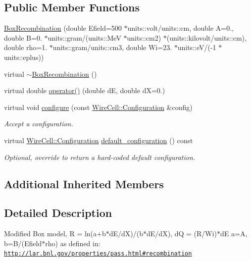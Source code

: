 \subsection*{Public Member Functions}
\begin{DoxyCompactItemize}
\item 
\hyperlink{class_wire_cell_1_1_gen_1_1_box_recombination_ab981d288d5ec8ab5bbba0e281bb0daa2}{Box\+Recombination} (double Efield=500 $\ast$units\+::volt/units\+::cm, double A=0., double B=0. $\ast$units\+::gram/(units\+::\+MeV $\ast$units\+::cm2) $\ast$(units\+::kilovolt/units\+::cm), double rho=1. $\ast$units\+::gram/units\+::cm3, double Wi=23. $\ast$units\+::eV/(-\/1 $\ast$units\+::eplus))
\item 
virtual \hyperlink{class_wire_cell_1_1_gen_1_1_box_recombination_a7cd263723366ecaf0cb87dc1fc752b5b}{$\sim$\+Box\+Recombination} ()
\item 
virtual double \hyperlink{class_wire_cell_1_1_gen_1_1_box_recombination_a9a7af321804662d507787c83b40dc1cb}{operator()} (double dE, double dX=0.)
\item 
virtual void \hyperlink{class_wire_cell_1_1_gen_1_1_box_recombination_af81aaca6ddde2aecdc3ee3d050611473}{configure} (const \hyperlink{namespace_wire_cell_a9f705541fc1d46c608b3d32c182333ee}{Wire\+Cell\+::\+Configuration} \&config)
\begin{DoxyCompactList}\small\item\em Accept a configuration. \end{DoxyCompactList}\item 
virtual \hyperlink{namespace_wire_cell_a9f705541fc1d46c608b3d32c182333ee}{Wire\+Cell\+::\+Configuration} \hyperlink{class_wire_cell_1_1_gen_1_1_box_recombination_ac3ef62f0f3f976f203418e3a1978a846}{default\+\_\+configuration} () const
\begin{DoxyCompactList}\small\item\em Optional, override to return a hard-\/coded default configuration. \end{DoxyCompactList}\end{DoxyCompactItemize}
\subsection*{Additional Inherited Members}


\subsection{Detailed Description}
Modified Box model, R = ln(a+b$\ast$d\+E/dX)/(b$\ast$d\+E/dX), dQ = (R/\+Wi)$\ast$dE a=A, b=B/(Efield$\ast$rho) as defined in\+: \href{http://lar.bnl.gov/properties/pass.html#recombination}{\tt http\+://lar.\+bnl.\+gov/properties/pass.\+html\#recombination} 

